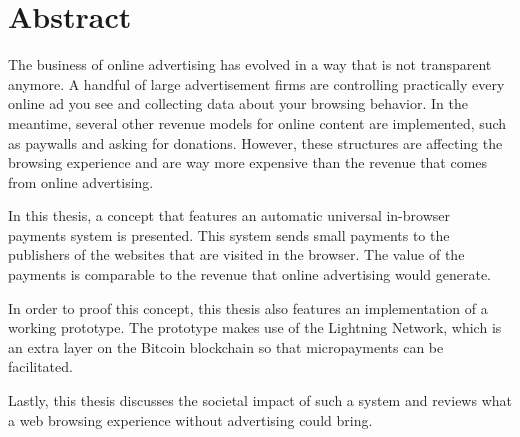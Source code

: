 \chapter*{Abstract}
\label{cha:abstract}
The business of online advertising has evolved in a way that is not transparent anymore. A handful of large advertisement firms are controlling practically every online ad you see and collecting data about your browsing behavior. In the meantime, several other revenue models for online content are implemented, such as paywalls and asking for donations. However, these structures are affecting the browsing experience and are way more expensive than the revenue that comes from online advertising. 

In this thesis, a concept that features an automatic universal in-browser payments system is presented. This system sends small payments to the publishers of the websites that are visited in the browser. The value of the payments is comparable to the revenue that online advertising would generate.

In order to proof this concept, this thesis also features an implementation of a working prototype. The prototype makes use of the Lightning Network, which is an extra layer on the Bitcoin blockchain so that micropayments can be facilitated.

Lastly, this thesis discusses the societal impact of such a system and reviews what a web browsing experience without advertising could bring. 